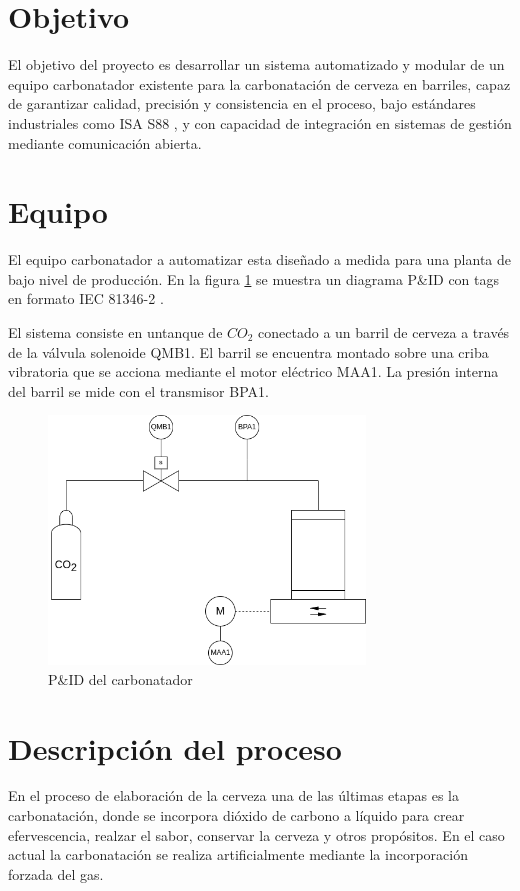 \section{Objetivo}

El objetivo del proyecto es desarrollar un sistema automatizado y modular de un equipo carbonatador existente para la carbonatación de cerveza en barriles, capaz de garantizar calidad, precisión y consistencia en el proceso, bajo estándares industriales como ISA S88 \cite{BRAN}, y con capacidad de integración en sistemas de gestión mediante comunicación abierta.

\section{Equipo}
El equipo carbonatador a automatizar esta diseñado a medida para una planta de bajo nivel de producción. En la figura \ref{fig:p-and-id} se muestra un diagrama P\&ID con tags en formato IEC 81346-2 \cite{IEC}.

El sistema consiste en untanque de \(CO_{2}\) conectado a un barril de cerveza a través de la válvula solenoide QMB1. El barril se encuentra montado sobre una criba vibratoria que se acciona mediante el motor eléctrico MAA1. La presión interna del barril se mide con el transmisor BPA1.

\begin{figure}[H]
  \centering
  \includegraphics[width=0.75\textwidth]{introduccion-general/img/p-and-id.png}
  \caption{P\&ID del carbonatador}
  \label{fig:p-and-id}
\end{figure}

\section{Descripción del proceso}
En el proceso de elaboración de la cerveza una de las últimas etapas es la carbonatación, donde se incorpora dióxido de carbono a líquido para crear efervescencia, realzar el sabor, conservar la cerveza y otros propósitos. En el caso actual la carbonatación se realiza artificialmente mediante la incorporación forzada del gas.

